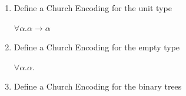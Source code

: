 \documentclass[10pt,\jkfside,a4paper]{article}
\newcommand{\answer}[1]{
    \begin{tcolorbox}[colframe=black, colback=white, sharp corners, boxrule=0.2mm, breakable]
        #1
    \end{tcolorbox}
}
\begin{document}
\begin{enumerate}
\begin{enumerate}
{            \textbf{RTP:} $\Phi(\Theta, \Gamma, \Lambda \alpha.\, e, \forall \alpha.\, B)$, that is, $\Theta \vdash \Gamma\ \mathsf{ctx} \Rightarrow \Theta \vdash \forall \alpha.\, B\ \mathsf{type}$.

            Suppose $\Theta \vdash \Gamma\ \mathsf{ctx}$. \hfill (1)

            By (1) and weakening, $\Theta, \alpha \vdash \Gamma\ \mathsf{ctx}$. \hfill (3)

            By (2) and (3), $\Theta, \alpha \vdash B\ \mathsf{type}$. \hfill (4)

            By (4), $\Theta \vdash \forall \alpha.\, B\ \mathsf{type}$.

            \textit{Type application case:}
            \[
                \frac{\Theta ; \Gamma \vdash e : \forall \alpha.\, B \quad \Theta \vdash A\ \mathsf{type}}{\Theta ; \Gamma \vdash e\;A : [A / \alpha] B}
            \]
            \textbf{IH:} $\Phi(\Theta, \Gamma, e, \forall \alpha.\, B)$, that is, $\Theta \vdash \Gamma\ \mathsf{ctx} \Rightarrow \Theta \vdash \forall \alpha.\, B\ \mathsf{type}$. \hfill (1)

            Assume $\Theta \vdash A\ \mathsf{type}$. \hfill (2)

            \textbf{RTP:} $\Phi(\Theta, \Gamma, e\;A, [A / \alpha] B)$.

            Assume $\Theta \vdash \Gamma\ \mathsf{ctx}$. \hfill (3)

            \textbf{RTP:} $\Theta \vdash [A / \alpha] B\ \mathsf{type}$.

            By (3) and (1), $\Theta \vdash \forall \alpha.\, B\ \mathsf{type}$. \hfill (4)

            By (4) and inversion, $\Theta, \alpha \vdash B\ \mathsf{type}$. \hfill (5)

            By (5), (2) and substitution, $\Theta \vdash [A / \alpha] B\ \mathsf{type}$.
        }

        \item
        Define a Church Encoding for the unit type

        \answer{ 
            $\forall \alpha. \alpha \to \alpha$
        }

        \item
        Define a Church Encoding for the empty type

        \answer{ 
            $\forall \alpha. \alpha$.
        }

        \item
        Define a Church Encoding for the binary trees


\end{enumerate}
\end{enumerate}
\end{document}
